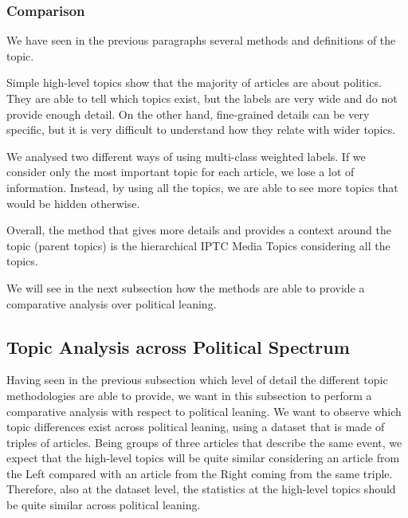 

\subsubsection{\statusgreen Comparison}

We have seen in the previous paragraphs several methods and definitions of the topic.

Simple high-level topics show that the majority of articles are about politics. They are able to tell which topics exist, but the labels are very wide and do not provide enough detail.
On the other hand, fine-grained details can be very specific, but it is very difficult to understand how they relate with wider topics.

We analysed two different ways of using multi-class weighted labels. If we consider only the most important topic for each article, we lose a lot of information. Instead, by using all the topics, we are able to see more topics that would be hidden otherwise.

Overall, the method that gives more details and provides a context around the topic (parent topics) is the hierarchical IPTC Media Topics considering all the topics.

We will see in the next subsection how the methods are able to provide a comparative analysis over political leaning.



\subsection{\statusgreen Topic Analysis across Political Spectrum}
\label{ssec:topics_topics_leaning}

Having seen in the previous subsection which level of detail the different topic methodologies are able to provide, we want in this subsection to perform a comparative analysis with respect to political leaning.
We want to observe which topic differences exist across political leaning, using a dataset that is made of triples of articles.
Being groups of three articles that describe the same event, we expect that the high-level topics will be quite similar considering an article from the Left compared with an article from the Right coming from the same triple.
Therefore, also at the dataset level, the statistics at the high-level topics should be quite similar across political leaning.

